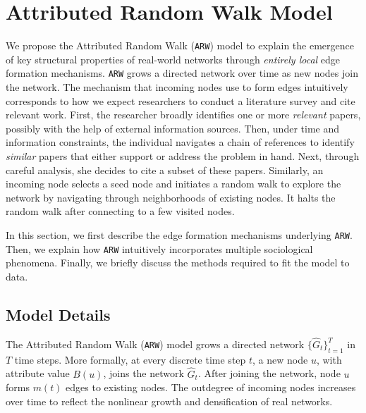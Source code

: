 
\section{Attributed Random Walk Model}
\label{sec:Proposed Model}
We propose the Attributed Random Walk (\texttt{ARW}) model to explain the emergence
of key structural properties of real-world networks through \textit{entirely local}
edge formation mechanisms.
\texttt{ARW} grows a directed network over time as new nodes join the network.
The mechanism that incoming nodes use to form edges intuitively corresponds to how we
expect researchers to conduct a literature survey and cite relevant work.
First, the researcher broadly identifies one or more \textit{relevant} papers,
possibly with the help of external information sources.
Then, under time and information constraints, the individual navigates a chain
of references to identify \textit{similar} papers that either support or
address the problem in hand.  Next, through careful analysis, she
decides to cite a subset of these papers.
Similarly, an incoming node selects a seed node and initiates a random walk to
explore the network by navigating through neighborhoods of existing nodes. It halts
the random walk after connecting to a few visited nodes.

In this section, we first describe the edge formation mechanisms underlying \texttt{ARW}.
Then, we explain how \texttt{ARW} intuitively incorporates multiple sociological phenomena.
Finally, we briefly discuss the methods required to fit the model to data.

\subsection{Model Details}
\label{sub:Model Description}


The Attributed Random Walk (\texttt{ARW}) model grows a directed network $\{\hat{G}_t\}^T_{t=1}$
in $T$ time steps.
More formally, at every discrete time step $t$, a
new node $u$, with attribute value $B(u)$, joins the network $\hat{G}_t$.
After joining the network, node $u$ forms $m(t)$ edges to
existing nodes.
The outdegree of incoming nodes increases over time to
reflect the nonlinear growth and densification of real networks.

